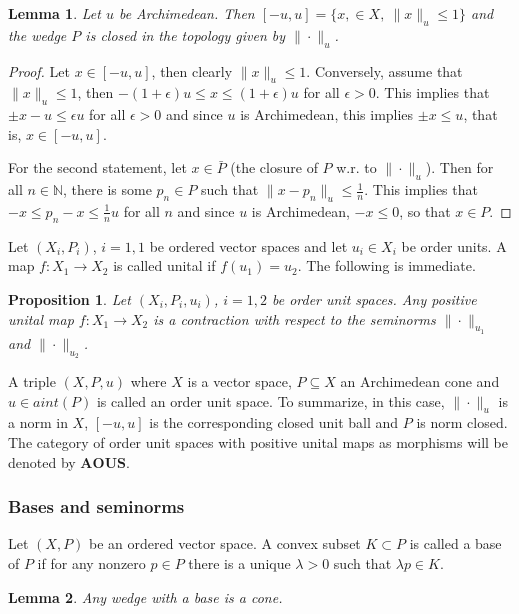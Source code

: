 \documentclass[12pt]{article}
\newtheorem{lemma}{Lemma}
\newtheorem{prop}{Proposition}
\theoremstyle{remark}
\newcommand{\<}{\langle}
\newcommand{\ct}[1]{\mathbf{#1}}
\begin{document}
\begin{lemma} Let $u$ be Archimedean. Then $[-u,u]=\{x,\in X,\ \|x\|_u\le 1\}$ and the wedge $P$ is closed in the topology given by $\|\cdot\|_u$.

\end{lemma}

\begin{proof} Let $x\in [-u,u]$, then clearly $\|x\|_u\le 1$. Conversely, assume that $\|x\|_u\le 1$, then $-(1+\epsilon) u\le x\le (1+\epsilon) u$ for all $\epsilon>0$. 
This implies that $\pm x-u\le \epsilon u$ for all $\epsilon>0$ and since $u$ is Archimedean, this implies $\pm x\le u$, that is, $x\in [-u,u]$.

For the second statement, let $x\in \bar P$ (the closure of $P$ w.r. to $\|\cdot\|_u$). Then for all $n\in \mathbb N$, there is some $p_n\in P$ such that $\|x-p_n\|_u\le \tfrac1n$. This implies that $-x\le p_n-x\le \tfrac 1n u$ for all $n$ and since  $u$ is Archimedean, $-x\le 0$, so that $x\in P$.

\end{proof}

Let $(X_i,P_i)$, $i=1,1$ be ordered vector spaces and let $u_i\in X_i$ be order units. A map $f:X_1\to X_2$ is called unital if $f(u_1)=u_2$. The following is immediate.

\begin{prop} Let $(X_i,P_i,u_i)$, $i=1,2$ be order unit spaces. Any positive unital map $f:X_1\to X_2$ is a contraction with respect to the seminorms $\|\cdot\|_{u_1}$ and 
$\|\cdot\|_{u_2}$.
\end{prop}

A triple $(X,P,u)$ where $X$ is a vector space, $P\subseteq X$ an Archimedean  cone and $u\in aint(P)$ is called an order unit space. To summarize, in this case, 
$\|\cdot\|_u$ is a norm in $X$, $[-u,u]$ is the corresponding closed unit ball and $P$ is norm closed. The category of order unit spaces with positive unital maps as morphisms will be denoted by $\ct{AOUS}$.


\subsubsection*{Bases and seminorms}

Let $(X,P)$ be an ordered vector space. A convex subset $K\subset P$ is called a base of $P$ if for any nonzero $p\in P$ there is a unique $\lambda>0$  such that 
$\lambda p\in K$.  

\begin{lemma} Any wedge with a base is a cone.

\end{lemma}
\end{document}
